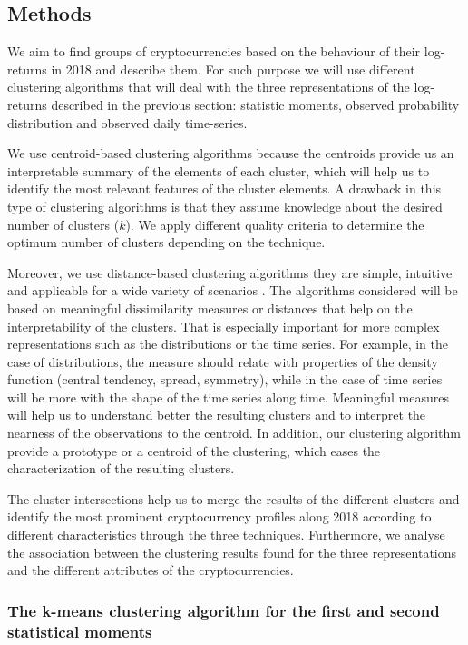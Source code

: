 \documentclass{bmcart}
\begin{document}
\subsection*{Methods}

We aim to find groups of cryptocurrencies based on the behaviour of their log-returns in 2018 and describe them. For such purpose we will use different clustering algorithms that will deal with the three representations of the log-returns described in the previous section:  statistic moments, observed probability distribution and observed daily time-series.

We use centroid-based clustering algorithms because the centroids provide us an interpretable summary of the elements of each cluster, which will help us to identify the most relevant features of the cluster elements. A drawback in this type of clustering algorithms is that they assume knowledge about the desired number of clusters ($k$). We apply different quality criteria to determine the optimum number of clusters depending on the technique.

Moreover, we use distance-based clustering algorithms they are simple, intuitive and applicable for a wide variety of scenarios \cite{DataClusteringAlgorithms2014}. The algorithms considered will be based on meaningful dissimilarity measures or distances that help on the interpretability of the clusters. That is especially important for more complex representations such as the distributions or the time series. For example, in the case of distributions, the measure should relate with properties of the density function (central tendency, spread, symmetry), while in the case of time series will be more with the shape of the time series along time. Meaningful measures will help us to understand better the resulting clusters and to interpret the nearness of the observations to the centroid. In addition, our clustering algorithm provide a prototype or a centroid of the clustering, which eases the characterization of the resulting clusters. 


The cluster intersections help us to merge the results of the different clusters and identify the most prominent cryptocurrency profiles along 2018 according to different characteristics through the three techniques. Furthermore, we analyse the association between the clustering results found for the three representations and the different attributes of the cryptocurrencies. 

\subsubsection*{The k-means clustering algorithm for the first and second statistical moments}
\end{document}
